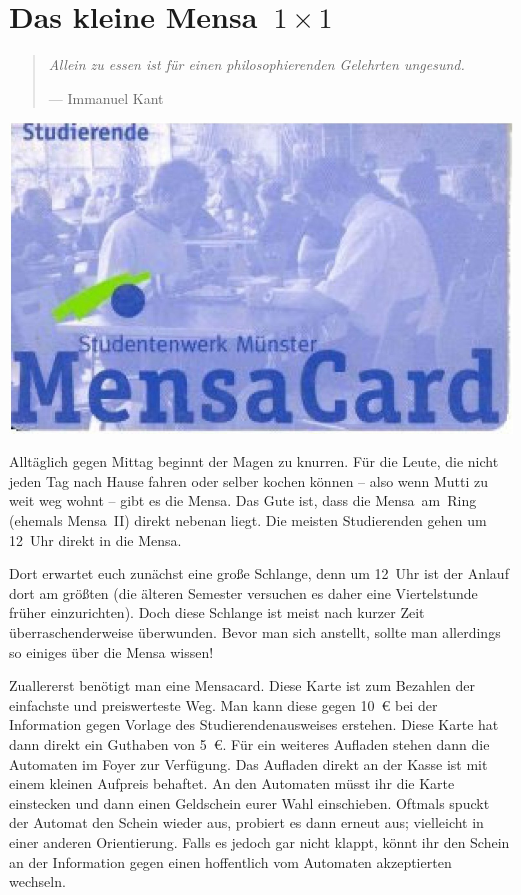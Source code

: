 \section[Das kleine Mensa~1~×~1]{\boldmath Das kleine Mensa~${1 \times 1}$}
\begin{multicols*}{2}
\begin{quote}
	\textit{Allein zu essen ist für einen philosophierenden Gelehrten ungesund.}
	
	\hfill--- Immanuel Kant
\end{quote}

\begin{center}
	\includegraphics[width=\columnwidth]{res/mensacard.png}
\end{center}

Alltäglich gegen Mittag beginnt der Magen zu knurren.
Für die Leute, die nicht jeden Tag nach Hause fahren oder selber kochen können -- also wenn Mutti zu weit weg wohnt -- gibt es die Mensa.
Das Gute ist, dass die Mensa~am~Ring (ehemals Mensa~II) direkt nebenan liegt.
Die meisten Studierenden gehen um 12~Uhr direkt in die Mensa.

Dort erwartet euch zunächst eine große Schlange, denn um 12~Uhr ist der Anlauf dort am größten (die älteren Semester versuchen es daher eine Viertelstunde früher einzurichten).
Doch diese Schlange ist meist nach kurzer Zeit überraschenderweise überwunden.
Bevor man sich anstellt, sollte man allerdings so einiges über die Mensa wissen!

Zuallererst benötigt man eine Mensacard.
Diese Karte ist zum Bezahlen der einfachste und preiswerteste Weg.
Man kann diese gegen \SI{10}{\euro} bei der Information gegen Vorlage des Studierendenausweises erstehen.
Diese Karte hat dann direkt ein Guthaben von \SI{5}{\euro}.
Für ein weiteres Aufladen stehen dann die Automaten im Foyer zur Verfügung.
Das Aufladen direkt an der Kasse ist mit einem kleinen Aufpreis behaftet.
An den Automaten müsst ihr die Karte einstecken und dann einen Geldschein eurer Wahl einschieben.
Oftmals spuckt der Automat den Schein wieder aus, probiert es dann erneut aus; vielleicht in einer anderen Orientierung.
Falls es jedoch gar nicht klappt, könnt ihr den Schein an der Information gegen einen hoffentlich vom Automaten akzeptierten wechseln.


\end{multicols*}

